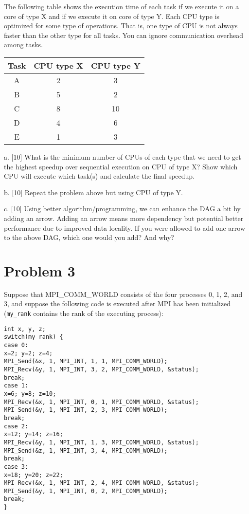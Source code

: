 \documentclass{article}
\begin{document}
The following table shows the execution time of each task if we execute it on a core of type X and if we execute it on core of type Y. Each CPU type is optimized for some type of operations. That is, one type of CPU is not always faster than the other type for all tasks. You can ignore communication overhead among tasks.

\begin{tabular}{|c|c|c|}
\hline
Task & CPU type X & CPU type Y \\
\hline
A & 2 & 3 \\
B & 5 & 2 \\
C & 8 & 10 \\
D & 4 & 6 \\
E & 1 & 3 \\
\hline
\end{tabular}

a. [10] What is the minimum number of CPUs of each type that we need to get the highest speedup over sequential execution on CPU of type X? Show which CPU will execute which task(s) and calculate the final speedup.

b. [10] Repeat the problem above but using CPU of type Y.

c. [10] Using better algorithm/programming, we can enhance the DAG a bit by adding an arrow. Adding an arrow means more dependency but potential better performance due to improved data locality. If you were allowed to add one arrow to the above DAG, which one would you add? And why?


\section*{Problem 3}
Suppose that MPI\_COMM\_WORLD consists of the four processes 0, 1, 2, and 3, and suppose the following code is executed after MPI has been initialized (\texttt{my\_rank} contains the rank of the executing process):

\begin{verbatim}
int x, y, z;
switch(my_rank) {
case 0:
x=2; y=2; z=4;
MPI_Send(&x, 1, MPI_INT, 1, 1, MPI_COMM_WORLD);
MPI_Recv(&y, 1, MPI_INT, 3, 2, MPI_COMM_WORLD, &status);
break;
case 1:
x=6; y=8; z=10;
MPI_Recv(&x, 1, MPI_INT, 0, 1, MPI_COMM_WORLD, &status);
MPI_Send(&y, 1, MPI_INT, 2, 3, MPI_COMM_WORLD);
break;
case 2:
x=12; y=14; z=16;
MPI_Recv(&y, 1, MPI_INT, 1, 3, MPI_COMM_WORLD, &status);
MPI_Send(&z, 1, MPI_INT, 3, 4, MPI_COMM_WORLD);
break;
case 3:
x=18; y=20; z=22;
MPI_Recv(&x, 1, MPI_INT, 2, 4, MPI_COMM_WORLD, &status);
MPI_Send(&y, 1, MPI_INT, 0, 2, MPI_COMM_WORLD);
break;
}
\end{verbatim}
\end{document}
